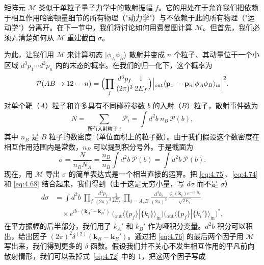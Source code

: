 矩阵元 $\mathcal{M}$ 类似于单粒子量子力学中的散射振幅 $f$。它的用处在于允许我们把依赖于相互作用哈密顿量细节的所有物理（"动力学"）与不依赖于此的所有物理（"运动学"）分离开。在下一节中，我们将讨论如何用费曼图计算 $\mathcal{M}$。但首先，我们必须弄清楚如何从 $\mathcal{M}$ 重建截面 $\sigma$。

为此，让我们用 $\mathcal{M}$ 来计算初态 $|\phi_A\phi_B\rangle$ 散射并变成 $n$ 个粒子、其动量位于一个小区域 $d^3p_1\cdots d^3p_n$ 内的末态的概率。在我们的归一化下，这个概率为
\begin{equation}
  \mathcal{P}(AB \to 12\cdots n)
    = \Bigl( \prod_f \frac{d^3p_f}{(2\pi)^3}\frac{1}{2E_f} \Bigr)
      \Bigl| {}_{\mathrm{out}}\langle \mathbf{p}_1\cdots\mathbf{p}_n
        |\phi_A\phi_B\rangle_{\mathrm{in}} \Bigr|^2 .
  \label{eq:4.74}
\end{equation}
对单个靶（$A$）粒子和许多具有不同碰撞参数 $b$ 的入射（$B$）粒子，散射事件数为
\begin{equation}
  N = \sum_{\text{所有入射粒子 } i}
    \mathcal{P}_i = \int d^2b\ n_B\,\mathcal{P}(b),
\end{equation}
其中 $n_B$ 是 $B$ 粒子的数密度（单位面积上的粒子数）。由于我们假设这个数密度在相互作用范围内是常数，$n_B$ 可以提到积分号外。于是截面为
\begin{equation}
  \sigma = \frac{N}{n_BN_A} = \frac{n_B}{n_B}\int d^2b\ \mathcal{P}(b)
    = \int d^2b\ \mathcal{P}(b) .
  \label{eq:4.75}
\end{equation}
现在，用 $\mathcal{M}$ 导出 $\sigma$ 的简单表达式是一个相当直接的运算。把 \eqref{eq:4.75}、\eqref{eq:4.74} 和 \eqref{eq:4.68} 结合起来，我们得到（由于这是无穷小量，写 $d\sigma$ 而不是 $\sigma$）
\begin{equation}
  \begin{aligned}
    d\sigma &= \int d^2b\ \prod_f \frac{d^3p_f}{(2\pi)^3}\frac{1}{2E_f}\
      \prod_{i=A,B}\frac{d^3k_i}{(2\pi)^3}\ \frac{\phi_i(\mathbf{k}_i)
        e^{-ib\cdot\mathbf{k}_i}}{\sqrt{2E_i}}\\
    &\quad \times e^{ib\cdot(\mathbf{k}_A'-\mathbf{k}_B')}\
      \bigl( {}_{\mathrm{out}}\langle\{p_f\}|\{k_i\}\rangle_{\mathrm{in}} \bigr)
      \bigl( {}_{\mathrm{out}}\langle\{p_f\}|\{k_i'\}\rangle_{\mathrm{in}}
        \bigr)^{*} ,
  \end{aligned}
  \label{eq:4.76}
\end{equation}
在平方振幅的后半部分，我们用了 $k_A'$ 和 $k_B'$ 作为哑积分变量。$d^2b$ 积分可以积出，给出因子 $(2\pi)^2\delta^{(2)}(\mathbf{k}_B-\mathbf{k}_B')$。通过把 \eqref{eq:4.76} 的最后两个因子用 $\mathcal{M}$ 写出来，我们得到更多的 $\delta$ 函数。假设我们并不关心不发生相互作用的平凡前向散射情形，我们可以丢掉式~\eqref{eq:4.72} 中的 1，把这两个因子写成
